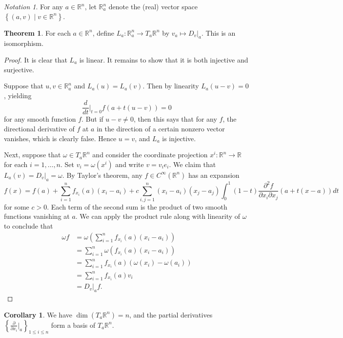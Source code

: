 \documentclass[10pt,letterpaper,cm]{nupset}
\theoremstyle{definition}
\theoremstyle{theorem}
\newtheorem{theorem}[definition]{Theorem}
\newtheorem{corollary}[definition]{Corollary}
\theoremstyle{remark}
\newtheorem*{notation}{Notation}
\newcommand{\R}{\mathbb R}
\newcommand{\1}{\mathbf{1}}
\newcommand{\0}{\vec 0}
\begin{document}
\begin{notation}
For any $a\in \R^n$, let $\R_a^n$ denote the (real) vector space $\left\{\left(a,v\right) \mid v \in \R^n\right\}$.
\end{notation}

\begin{theorem}
For each $a \in \R^n$, define $L_a : \R_a^n \to T_a\R^n$ by $v_a \mapsto D_v\bigr\rvert_a$. This is an isomorphism. 
\end{theorem}
\begin{proof}
It is clear that $L_a$ is linear. It remains to show that it is both injective and surjective. 

\medskip


Suppose that $u, v \in \R_a^n$ and $L_a(u) = L_a(v)$. Then by linearity $L_a(u-v) = 0$, yielding $$\frac{d}{d{t}}\bigr\rvert_{t=0} f(a + t(u-v)) = 0$$ for any smooth function $f$. But if $u-v \ne 0$, then this says that for any $f$, the directional derivative of $f$ at $a$ in the direction of a certain nonzero vector vanishes, which is clearly false. Hence $u=v$, and $L_a$ is injective. 

\medskip


Next, suppose that $\omega \in T_a\R^n$ and consider the coordinate projection $x^i : \R^n \to \R$ for each $i=1, \ldots, n$. Set $v_i = \omega(x^i)$ and write $v= v_ie_i$. We claim that $L_a(v) = D_v\bigr\rvert_a = \omega$. By Taylor's theorem, any $f\in C^{\infty}(\R^n)$ has an expansion $$f(x) = f(a) + \sum_{i=1}^n f_{x_i}(a)(x_i-a_i) + c\sum_{i, j=1}^n(x_i - a_i)(x_j-a_j) \int_{0}^1(1-t) \frac{\partial^2{f}}{\partial{x_i}\partial{x_j}}\left(a+t(x-a)\right)dt$$ for some $c >0$. Each term of the second sum is the product of two smooth functions vanishing at $a$. We can apply the product rule along with linearity of $\omega$ to conclude that 
\begin{align*}
\omega f & = \omega \left(\sum_{i=1}^n f_{x_i}(a)(x_i-a_i)\right) 
\\ & =\sum_{i=1}^n \omega(f_{x_i}(a)(x_i -a_i)) 
\\ & = \sum_{i=1}^n f_{x_i}(a)( \omega(x_i) -\omega(a_i))
\\ & = \sum_{i=1}^n f_{x_i}(a)v_i 
\\ & =  D_v\bigr\rvert_a f.
\end{align*}
\end{proof}

\begin{corollary}
We have $\dim(T_a\R^n) = n$, and the partial derivatives $\left\{\frac{\partial}{\partial{x_i}}\bigr\rvert_a\right\}_{1\leq i \leq n}$ form a basis of $T_a\R^n$. 
\end{corollary}
\end{document}
